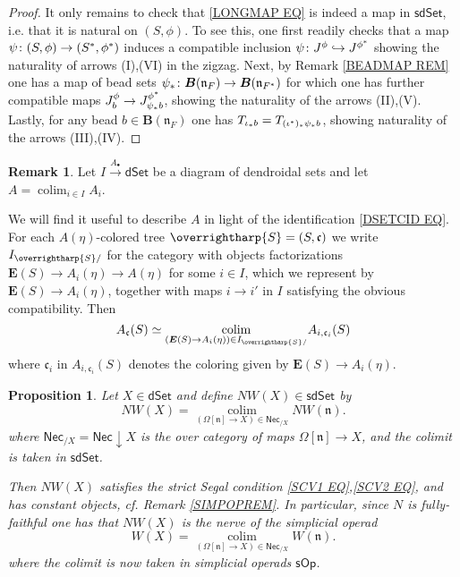 \documentclass[a4paper,10pt
,draft
]{article}%
\numberwithin{equation}{section}
\numberwithin{figure}{section}
\newtheorem{proposition}[equation]{Proposition}%
\theoremstyle{definition} %
\newtheorem{remark}[equation]{Remark}%
\newcommand{\vect}[1]{\text{\overrightharp{\ensuremath{#1}}}}
\DeclareMathOperator{\colim}{colim}%
\newcommand{\1}{\ensuremath{\mathbbm 1}}%
\begin{document}
\begin{proof}
	It only remains to check that
	\eqref{LONGMAP EQ}
	is indeed a map in 
	$\mathsf{sdSet}$, i.e. that it is natural on 
	$(S,\phi)$.
	To see this, one first readily checks that a map
	$\psi \colon (S,\phi) \to (S^{\**},\phi^{\**})$
	induces a compatible inclusion
	$\psi \colon J^{\phi} \hookrightarrow J^{\phi^{\**}}$
	showing the naturality of arrows (I),(VI) 
	in the zigzag.
%
	Next, by Remark \ref{BEADMAP REM}
	one has a map of bead sets
	$\psi_{\**} \colon 
	\boldsymbol{B}(\mathfrak{n}_{F})
	\to
	\boldsymbol{B}(\mathfrak{n}_{F^{\**}})$
	for which one has further compatible maps
	$J^{\phi}_b
	\to 
	J^{\phi^{\**}}_{\psi_{\**}b}$,
	showing the naturality of the arrows (II),(V).
	Lastly, for any bead 
	$b \in \boldsymbol{B}(\mathfrak{n}_{F})$
	one has
	$T_{\iota_{\**}b} = T_{(\iota^{\**})_{\**} \psi_{\**}b}$,
	showing naturality of the arrows (III),(IV).
\end{proof}



\begin{remark}\label{PREOPCOLEV REM}
	Let $I \xrightarrow{A_{\bullet}} \mathsf{dSet}$
	be a diagram of dendroidal sets and let
	$A = \colim_{i \in I} A_i$.

	We will find it useful to describe $A$
	in light of the identification \eqref{DSETCID EQ}.
	For each $A(\eta)$-colored tree 
	$\vect{S} = (S,\mathfrak{c})$
	we write
	$I_{\vect{S}/}$
	for the category with objects factorizations
	$\boldsymbol{E}(S) \to A_i(\eta) \to A(\eta)$ 
	for some $i \in I$,
	which we represent by 
	$\boldsymbol{E}(S) \to A_i(\eta)$,
	together with maps $i \to i'$ in $I$
	satisfying the obvious compatibility.
%	
	Then
\begin{equation}\label{COLIMALT EQ}
	A_{\mathfrak{c}}(S) \simeq 
	\underset{(\boldsymbol{E}(S) \to A_i(\eta)) \in I_{\vect{S}/}}{\colim}
	A_{i,
	\mathfrak{c}_i}(S)
\end{equation}
	where $\mathfrak{c}_i$ in 
	$A_{i,\mathfrak{c}_i}(S)$
	denotes the coloring given by
	$\boldsymbol{E}(S) \to A_i(\eta)$.
\end{remark}



\begin{proposition}\label{NWKANEX_PROP}
	Let $X \in \mathsf{dSet}$ and define
	$NW(X) \in \mathsf{sdSet}$ by
	\begin{equation}\label{NWKANEX EQ}
	NW(X) =
	\underset{(\Omega[\mathfrak{n}] \to X)
		\in \mathsf{Nec}_{/X}}{\colim}
	NW(\mathfrak{n}).
	\end{equation}
	where
	$\mathsf{Nec}_{/X} = \mathsf{Nec} \downarrow X$ is the over category of maps $\Omega[\mathfrak{n}] \to X$, and
	the colimit is taken in $\mathsf{sdSet}$.

	Then $NW(X)$ satisfies the strict Segal condition
	\eqref{SCV1 EQ},\eqref{SCV2 EQ},
	and has constant objects, cf. Remark \ref{SIMPOPREM}.
	In particular, since $N$ is fully-faithful one has that
	$NW(X)$ is the nerve of the simplicial operad
\[
	W(X) =
	\underset{
	(\Omega[\mathfrak{n}] \to X)
	\in \mathsf{Nec}_{/X}}{\colim}
	W(\mathfrak{n}).
\]
	where the colimit is now taken in simplicial operads
	$\mathsf{sOp}$.
\end{proposition}
\end{document}
